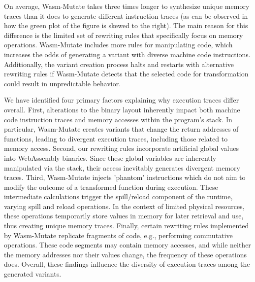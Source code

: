 \documentclass[a4paper,fleqn]{cas-dc}
\newcommand*\badge[1]{ \colorbox{red}{\color{white}#1}}
\newcommand{\tool}{{\sc Wasm-Mutate}\xspace}
\newcommand{\Wasm}{WebAssembly\xspace}
\newcommand{\wasm}{\Wasm}
\newcommand{\todo}[1]{%
\refstepcounter{todo}
\noindent\textbf{\badge{TODO}} {\color{red}#1}
\addcontentsline{td}{todo}
{\color{red}\thesection.\thetodo\xspace #1}}
\begin{document}
On average, \tool takes three times longer to synthesize unique memory traces than it does to generate different instruction traces (as can be observed in how the green plot of the figure is skewed to the right). 
The main reason for this difference is the limited set of rewriting rules that specifically focus on memory operations. 
\tool includes more rules for manipulating code, which increases the odds of generating a variant with diverse machine code instructions.
Additionally, the variant creation process halts and restarts with alternative rewriting rules if \tool detects that the selected code for transformation could result in unpredictable behavior. 

We have identified four primary factors explaining why execution traces differ overall.
First, alterations to the binary layout inherently impact both machine code instruction traces and memory accesses within the program's stack. 
In particular, \tool creates variants that change the return addresses of functions, leading to divergent execution traces, including those related to memory access. 
Second, our rewriting rules incorporate artificial global values into \wasm binaries. 
Since these global variables are inherently manipulated via the stack, their access inevitably generates divergent memory traces.
Third, \tool injects 'phantom' instructions which do not aim to modify the outcome of a transformed function during execution. 
These intermediate calculations trigger the spill/reload component of the runtime, varying spill and reload operations. 
In the context of limited physical resources, these operations temporarily store values in memory for later retrieval and use, thus creating unique memory traces.
Finally, certain rewriting rules implemented by \tool replicate fragments of code, e.g., performing commutative operations. 
These code segments may contain memory accesses, and while neither the memory addresses nor their values change, the frequency of these operations does.
Overall, these findings influence the diversity of execution traces among the generated variants. 
\end{document}
